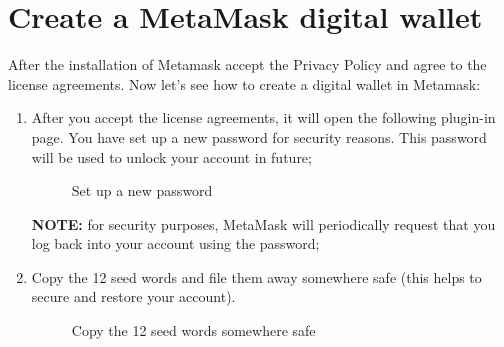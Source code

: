 \documentclass[ManualeUtente]{subfiles}
\begin{document}
\section{Create a MetaMask digital wallet}
After the installation of Metamask accept the Privacy Policy and agree to the license agreements. Now let's see how to create a digital wallet in Metamask:
\begin{enumerate}	
	\item After you accept the license agreements, it will open the following plugin-in page. You have set up a new password for security reasons. This password will be used to unlock your account in future;
	\begin{figure}[H]
		\centering
		\caption{Set up a new password}
		\label{fig:Set up a new password}
	\end{figure}
	\textbf{NOTE:} for security purposes, MetaMask will periodically request that you log back into your account using the password;
	\item Copy the 12 seed words and file them away somewhere safe (this helps to secure and restore your account).
	\begin{figure}[H]
		\centering
		\caption{Copy the 12 seed words somewhere safe}
		\label{fig:Copy the 12 seed words somewhere safe}
	\end{figure}
\end{enumerate}
\end{document}
